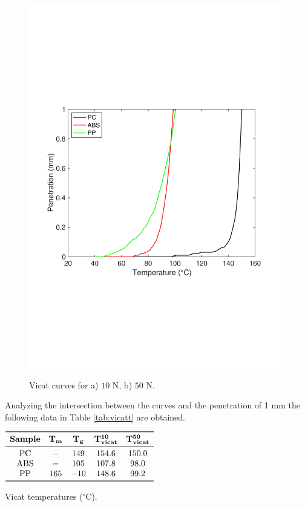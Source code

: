 \documentclass[a4paper, 11pt]{article}
\begin{document}
\begin{figure}[htp]
	{\includegraphics[scale=0.36]{vicat50}}\qquad
	\captionsetup{justification=centering}
	\caption{Vicat curves for a) $10$ N, b) $50$ N.}
	\label{fig:vicat}
\end{figure}

Analyzing the intersection between the curves and the penetration of 1 mm the following data in Table \ref{tab:vicatt} are obtained.

\begin{table}[htp]
	\centering
	$
	\begin{array}{ccccc}
	\toprule
	\textbf{Sample} & \mathbf{T_{m}} & \mathbf{T_{g}} & \mathbf{T_{vicat}^\textbf{10}} & \mathbf{T_{vicat}^\textbf{50}} \\
	\midrule
	\text{PC} & - & 149 & 154.6 & 150.0\\
	\text{ABS} & - & 105 & 107.8 & 98.0\\
	\text{PP} & 165 & -10 & 148.6 & 99.2\\
	\bottomrule
	\end{array}
	$
	\caption{Vicat temperatures ($^\circ$C).}
	\label{tab:vicatt}
\end{table}
\end{document}
